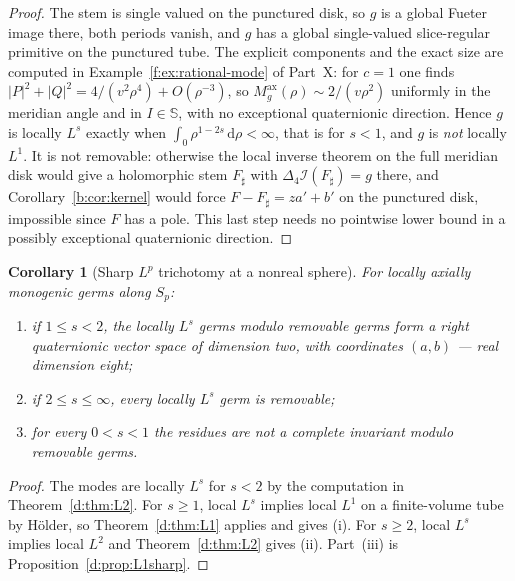 \documentclass[11pt,a4paper]{article}
\numberwithin{equation}{section}
\newtheorem{corollary}[theorem]{Corollary}
\theoremstyle{definition}
\theoremstyle{remark}
\theoremstyle{plain}
\newcommand{\SSS}{\mathbb S}
\newcommand{\lap}{\Delta_4}
\newcommand{\I}{\mathcal I}
\newcommand{\Sp}{S_{p}}
\newcommand{\Max}{M^{\mathrm{ax}}}                    %
\newcommand{\abs}[1]{\lvert #1\rvert}
\newcommand{\dd}{\mathrm d}
\begin{document}
\begin{proof}
The stem is single valued on the punctured disk, so $g$ is a global Fueter
image there, both periods vanish, and $g$ has a global single-valued
slice-regular primitive on the punctured tube.  The explicit components and
the exact size are computed in Example~\ref{f:ex:rational-mode} of Part~X:
for $c=1$ one finds $\abs P^2+\abs Q^2=4/(v^2\rho^4)+O(\rho^{-3})$, so
$\Max_g(\rho)\sim2/(v\rho^2)$ uniformly in the meridian angle and in
$I\in\SSS$, with no exceptional quaternionic direction.  Hence $g$ is
locally $L^s$ exactly when $\int_0\rho^{1-2s}\,\dd\rho<\infty$, that is for
$s<1$, and $g$ is \emph{not} locally $L^1$.  It is not removable:
otherwise the local inverse theorem on the full meridian disk would give a
holomorphic stem $F_\sharp$ with $\lap\I(F_\sharp)=g$ there, and
Corollary~\ref{b:cor:kernel} would force $F-F_\sharp=za'+b'$ on the
punctured disk, impossible since $F$ has a pole.  This last step needs no
pointwise lower bound in a possibly exceptional quaternionic direction.
\end{proof}

\begin{corollary}[Sharp $L^p$ trichotomy at a nonreal sphere]
\label{d:cor:Lp}
For locally axially monogenic germs along $\Sp$:
\begin{enumerate}[label=\textup{(\roman*)}]
\item if $1\le s<2$, the locally $L^s$ germs modulo removable germs form a
right quaternionic vector space of dimension two, with coordinates
$(a,b)$ --- real dimension eight;
\item if $2\le s\le\infty$, every locally $L^s$ germ is removable;
\item for every $0<s<1$ the residues are \emph{not} a complete invariant
modulo removable germs.
\end{enumerate}
\end{corollary}

\begin{proof}
The modes are locally $L^s$ for $s<2$ by the computation in
Theorem~\ref{d:thm:L2}.  For $s\ge1$, local $L^s$ implies local $L^1$ on a
finite-volume tube by H\"older, so Theorem~\ref{d:thm:L1} applies and gives
(i).  For $s\ge2$, local $L^s$ implies local $L^2$ and
Theorem~\ref{d:thm:L2} gives (ii).  Part~(iii) is
Proposition~\ref{d:prop:L1sharp}.
\end{proof}
\end{document}

